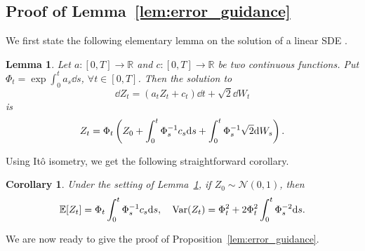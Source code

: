 \documentclass{article}
\theoremstyle{plain}
\newtheorem{lemma}[theorem]{Lemma}
\newtheorem{corollary}[theorem]{Corollary}
\theoremstyle{definition}
\theoremstyle{remark}
\begin{document}
\subsection{Proof of Lemma~\ref{lem:error_guidance}}
\label{proof_lem_error_guidance}
We first state the following elementary lemma on the solution of a linear SDE \citep[Chapter 4.2]{Kloeden1992numerical}.
\begin{lemma}
	\label{lem:sde_exact}
	Let $a: [0,T] \to \mathbb R$ and $c:[0, T] \to \mathbb R$ be two continuous functions. Put $\Phi_t= \exp\int_0^t a_s \dd s$, $\forall t \in [0, T]$. Then the solution to
	\begin{equation}
		\label{eq:sde_general}
		\dd Z_t = (a_t Z_t + c_t) \dd t+ \sqrt 2 \dd W_t
	\end{equation}
	is
	\begin{equation}
		Z_t = \Phi_t\left( Z_0 + \int_0^t \Phi_s^{-1} c_s \dd s + \int_0^t \Phi_s^{-1} \sqrt 2 \dd W_s \right).
	\end{equation}
\end{lemma}
Using It\^o isometry, we get the following straightforward corollary.
\begin{corollary}
	\label{cor:exact_mean_cov}
	Under the setting of Lemma~\ref{lem:sde_exact}, if $Z_0 \sim \mathcal N(0, 1)$, then
	\begin{align}
		\mathbb{E}[Z_t] = \Phi_t \int_0^t \Phi_s^{-1} c_s \dd s,\quad \operatorname{Var}(Z_t) = \Phi_t^2 + 2\Phi_t^2\int_0^t \Phi_s^{-2} \dd s.
	\end{align}
\end{corollary}
We are now ready to give the proof of Proposition~\ref{lem:error_guidance}.
\newcommand{\hatbar}[1]{\hat {\bar #1}}
\newcommand{\powertp}[1]{{#1}^{(T)}}
\end{document}
